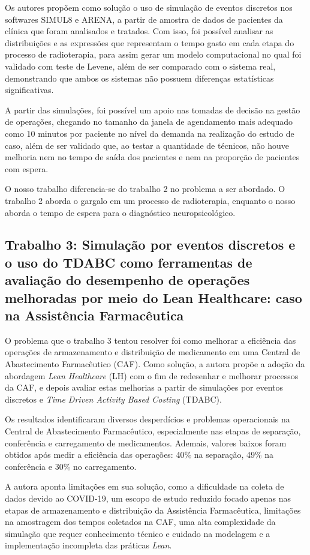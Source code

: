 \documentclass[
    12pt,
    openright,
    oneside,
    a4paper,
    english,
    brazil
]{abntex2}
\begin{document}
Os autores propõem como solução o uso de simulação de eventos discretos nos softwares SIMUL8 e ARENA, a partir de amostra de dados de pacientes da clínica que foram analisados e tratados. Com isso, foi possível analisar as distribuições e as expressões que representam o tempo gasto em cada etapa do processo de radioterapia, para assim gerar um modelo computacional no qual foi validado com teste de Levene, além de ser comparado com o sistema real, demonstrando que ambos os sistemas não possuem diferenças estatísticas significativas.

A partir das simulações, foi possível um apoio nas tomadas de decisão na gestão de operações, chegando no tamanho da janela de agendamento mais adequado como 10 minutos por paciente no nível da demanda na realização do estudo de caso, além de ser validado que, ao testar a quantidade de técnicos, não houve melhoria nem no tempo de saída dos pacientes e nem na proporção de pacientes com espera.

O nosso trabalho diferencia-se do trabalho 2 no problema a ser abordado. O trabalho 2 aborda o gargalo em um processo de radioterapia, enquanto o nosso aborda o tempo de espera para o diagnóstico neuropsicológico.

\subsection{Trabalho 3: Simulação por eventos discretos e o uso do TDABC como ferramentas de avaliação do desempenho de operações melhoradas por meio do Lean Healthcare: caso na Assistência Farmacêutica \cite{Bittencourt2022}}

O problema que o trabalho 3 tentou resolver foi como melhorar a eficiência das operações de armazenamento e distribuição de medicamento em uma Central de Abastecimento Farmacêutico (CAF). Como solução, a autora propõe a adoção da abordagem \textit{Lean Healthcare} (LH) com o fim de redesenhar e melhorar processos da CAF, e depois avaliar estas melhorias a partir de simulações por eventos discretos e \textit{Time Driven Activity Based Costing} (TDABC).

Os resultados identificaram diversos desperdícios e problemas operacionais na Central de Abastecimento Farmacêutico, especialmente nas etapas de separação, conferência e carregamento de medicamentos. Ademais, valores baixos foram obtidos após medir a eficiência das operações: 40\% na separação, 49\% na conferência e 30\% no carregamento.

A autora aponta limitações em sua solução, como a dificuldade na coleta de dados devido ao COVID-19, um escopo de estudo reduzido focado apenas nas etapas de armazenamento e distribuição da Assistência Farmacêutica, limitações na amostragem dos tempos coletados na CAF, uma alta complexidade da simulação que requer conhecimento técnico e cuidado na modelagem e a implementação incompleta das práticas \textit{Lean}.
\end{document}
